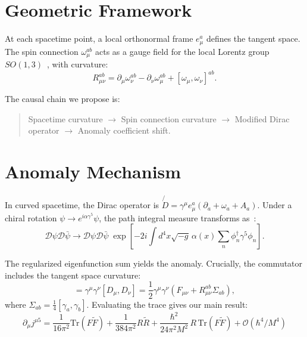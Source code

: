 \documentclass[reprint,aps,pra]{revtex4-2}
\begin{document}
\section{Geometric Framework}

At each spacetime point, a local orthonormal frame $e^a_\mu$ defines the tangent space. The spin connection $\omega^{ab}_\mu$ acts as a gauge field for the local Lorentz group $SO(1,3)$~\cite{nakahara2003}, with curvature:
\begin{equation}
R^{ab}_{\mu\nu} = \partial_\mu \omega^{ab}_\nu - \partial_\nu \omega^{ab}_\mu 
+ [\omega_\mu, \omega_\nu]^{ab}.
\label{eq:spin}
\end{equation}

The causal chain we propose is:
\begin{quote}
Spacetime curvature $\rightarrow$ Spin connection curvature $\rightarrow$ 
Modified Dirac operator $\rightarrow$ Anomaly coefficient shift.
\end{quote}

\section{Anomaly Mechanism}

In curved spacetime, the Dirac operator is $\not{D} = \gamma^\mu e^a_\mu (\partial_a + \omega_a + A_a)$. 
Under a chiral rotation $\psi \to e^{i\alpha\gamma^5}\psi$, the path integral measure transforms 
as~\cite{fujikawa1979}:
\begin{equation}
\mathcal{D}\psi\mathcal{D}\bar{\psi} \to \mathcal{D}\psi\mathcal{D}\bar{\psi} \;
\exp\left[-2i\int d^4x\sqrt{-g}\,\alpha(x)\sum_n \phi_n^\dagger\gamma^5\phi_n\right].
\label{eq:measure}
\end{equation}

The regularized eigenfunction sum yields the anomaly. Crucially, the commutator includes 
the tangent space curvature:
\begin{equation}
[\not{D}, \not{D}] = \gamma^\mu\gamma^\nu [D_\mu, D_\nu] 
= \frac{1}{2}\gamma^\mu\gamma^\nu (F_{\mu\nu} + R^{ab}_{\mu\nu}\Sigma_{ab}),
\label{eq:commutator}
\end{equation}
where $\Sigma_{ab} = \frac{1}{4}[\gamma_a, \gamma_b]$. Evaluating the trace gives our main result:
\begin{equation}
\boxed{
\partial_\mu j^{\mu 5} = \frac{1}{16\pi^2} \text{Tr}(F\tilde{F})
+ \frac{1}{384\pi^2} R\tilde{R}
+ \frac{\hbar^2}{24\pi^2 M^2}\, R\,\text{Tr}(F\tilde{F}) + \mathcal{O}(\hbar^4/M^4)
}
\label{eq:main}
\end{equation}
\end{document}
